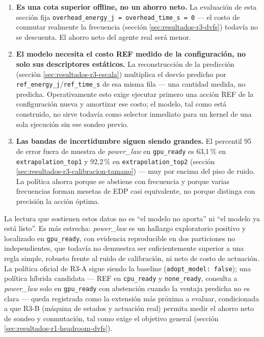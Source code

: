 \documentclass[12pt,oneside,spanish]{book}
\begin{document}
\begin{enumerate}
    \item \textbf{Es una cota superior offline, no un ahorro neto.} La evaluación de esta sección fija \texttt{overhead\_energy\_j = overhead\_time\_s = 0} --- el costo de conmutar realmente la frecuencia (sección \ref{sec:resultados-r3-dvfs}) todavía no se descuenta. El ahorro neto del agente real será menor.
    \item \textbf{El modelo necesita el costo REF medido de la configuración, no solo sus descriptores estáticos.} La reconstrucción de la predicción (sección \ref{sec:resultados-r3-escala}) multiplica el desvío predicho por \texttt{ref\_energy\_j}/\texttt{ref\_time\_s} de esa misma fila --- una cantidad medida, no predicha. Operativamente esto exige ejecutar primero una acción REF de la configuración nueva y amortizar ese costo; el modelo, tal como está construido, no sirve todavía como selector inmediato para un kernel de una sola ejecución sin ese sondeo previo.
    \item \textbf{Las bandas de incertidumbre siguen siendo grandes.} El percentil 95 de error fuera de muestra de \textit{power\_law} en \texttt{gpu\_ready} es 63,1\,\% en \texttt{extrapolation\_top1} y 92,2\,\% en \texttt{extrapolation\_top2} (sección \ref{sec:resultados-r3-calibracion-tamano}) --- muy por encima del piso de ruido. La política ahorra porque se abstiene con frecuencia y porque varias frecuencias forman mesetas de EDP casi equivalente, no porque distinga con precisión la acción óptima.
\end{enumerate}

La lectura que sostienen estos datos no es ``el modelo no aporta'' ni ``el modelo ya está listo''. Es más estrecha: \textit{power\_law} es un hallazgo exploratorio positivo y localizado en \texttt{gpu\_ready}, con evidencia reproducible en dos particiones no independientes, que todavía no demuestra ser suficientemente superior a una regla simple, robusto frente al ruido de calibración, ni neto de costo de actuación. La política oficial de R3-A sigue siendo la baseline (\texttt{adopt\_model: false}); una política híbrida candidata --- REF en \texttt{cpu\_ready} y \texttt{none\_ready}, consulta a \textit{power\_law} solo en \texttt{gpu\_ready} con abstención cuando la ventaja predicha no es clara --- queda registrada como la extensión más próxima a evaluar, condicionada a que R3-B (máquina de estados y actuación real) permita medir el ahorro neto de sondeo y conmutación, tal como exige el objetivo general (sección \ref{sec:resultados-r1-headroom-dvfs}).
\end{document}
